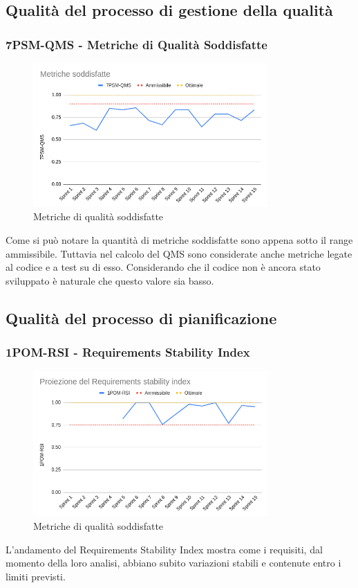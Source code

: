 \documentclass{article}
\begin{document}
    \subsection{Qualità del processo di gestione della qualità}
        \subsubsection{7PSM-QMS - Metriche di Qualità Soddisfatte}
        \begin{figure}[H]
            \centering
            \includegraphics[width=0.8\textwidth]{../../img/pdq_charts/chart6-metricheSoddisfatte.png}
            \caption{Metriche di qualità soddisfatte}
        \end{figure}
        Come si può notare la quantità di metriche soddisfatte sono appena sotto il range ammissibile. Tuttavia nel calcolo del QMS sono considerate anche metriche legate al codice e a test su di esso. Considerando che il codice non è ancora stato sviluppato è naturale che questo valore sia basso.


    \subsection{Qualità del processo di pianificazione}
        \subsubsection{1POM-RSI - Requirements Stability Index}
        \begin{figure}[H]
            \centering
            \includegraphics[width=0.8\textwidth]{../../img/pdq_charts/chart7-proiezioneRSI.png}
            \caption{Metriche di qualità soddisfatte}
        \end{figure}
        L'andamento del Requirements Stability Index mostra come i requisiti, dal momento della loro analisi, abbiano subito variazioni stabili e contenute entro i limiti previsti.
\end{document}
